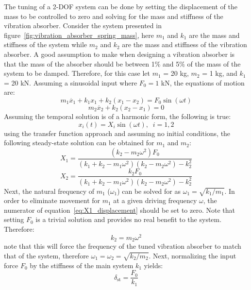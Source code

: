 \documentclass[12pt,letter]{article}
\begin{document}
The tuning of a 2-DOF system can be done by setting the displacement of the mass to be controlled to zero and solving for the mass and stiffness of the vibration absorber. Consider the system presented in figure~\ref{fig:vibration_absorber_spring_mass}, here $m_1$ and $k_1$ are the mass and stiffness of the system while $m_2$ and $k_2$ are the mass and stiffness of the vibration absorber. A good assumption to make when designing a vibration absorber is that the mass of the absorber should be between 1\% and 5\% of the mass of the system to be damped. Therefore, for this case let $m_1$ = 20 kg, $m_2$ = 1 kg, and $k_1$ = 20 kN. Assuming a sinusoidal input where $F_0 = 1$ kN, the equations of motion are:
\begin{equation}
m_1\ddot{x_1} + k_1 x_1 + k_2(x_1-x_2)  = F_0 \sin (\omega t)
\end{equation}
\begin{equation}
m_2\ddot{x_2} + k_2(x_2-x_1) = 0
\end{equation}
Assuming the temporal solution is of a harmonic form, the following is true:
\begin{equation}
x_i(t) = X_i \sin (\omega t ), \; \; i=1,2
\end{equation}
using the transfer function approach and assuming no initial conditions, the following steady-state solution can be obtained for $m_1$ and $m_2$:
\begin{equation}
X_1 = \frac{(k_2 - m_2 \omega^2)F_0}{(k_1+k_2-m_1 \omega^2)(k_2-m_2 \omega^2) -k_2^2}
\label{eq:X1_displacement}
\end{equation}
\begin{equation}
X_2 = \frac{k_2 F_0}{(k_1+k_2-m_1 \omega^2)(k_2-m_2 \omega^2) -k_2^2}
\label{eq:X2_displacement}
\end{equation}
Next, the natural frequency of $m_1$ ($\omega_1$) can be solved for as $\omega_1=\sqrt{k_1 / m_1}$. In order to eliminate movement for $m_1$ at a given driving frequency $\omega$, the numerator of equation~\ref{eq:X1_displacement} should be set to zero. Note that setting $F_0$ is a trivial solution and provides no real benefit to the system. Therefore:
\begin{equation}
k_2 = m_2 \omega^2
\end{equation}
note that this will force the frequency of the tuned vibration absorber to match that of the system, therefore $\omega_1 = \omega_2 = \sqrt{k_2 / m_2}$. Next, normalizing the input force $F_0$ by the stiffness of the main system $k_1$ yields:
\begin{equation}
\delta_{\text{st}} = \frac{F_0}{k_1}
\end{equation}
\end{document}
